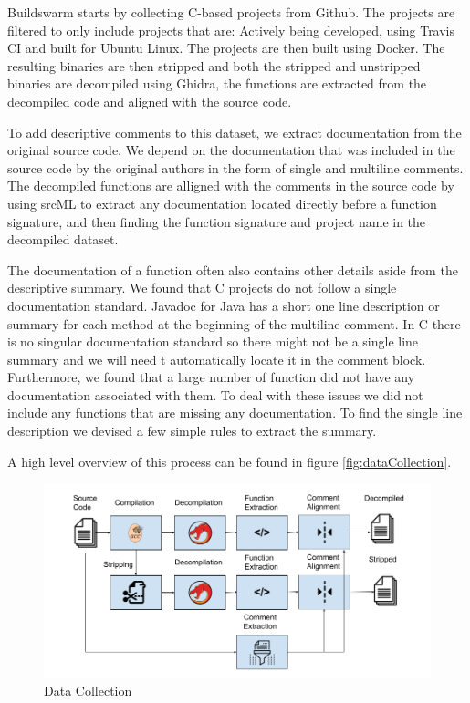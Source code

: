 Buildswarm starts by collecting C-based projects from Github. The projects are filtered to only include projects that are: Actively being developed, using Travis CI and built for Ubuntu Linux. The projects are then built using Docker. The resulting binaries are then stripped and both the stripped and unstripped binaries are decompiled using Ghidra, the functions are extracted from the decompiled code and aligned with the source code. 

To add descriptive comments to this dataset, we extract documentation from the original source code. We depend on the documentation that was included in the source code by the original authors in the form of single and multiline comments. The decompiled functions are alligned with the comments in the source code by using srcML to extract any documentation located directly before a function signature, and then finding the function signature and project name in the decompiled dataset.

The documentation of a function often also contains other details aside from the descriptive summary. We found that C projects do not follow a single documentation standard. Javadoc for Java has a short one line description or summary for each method at the beginning of the multiline comment. In C there is no singular documentation standard so there might not be a single line summary and we will need t automatically locate it in the comment block. 
Furthermore, we found that a large number of function did not have any documentation associated with them. To deal with these issues we did not include any functions that are missing any documentation. To find the single line description we devised a few simple rules to extract the summary.

A high level overview of this process can be found in figure \ref{fig:dataCollection}.

\label{fig:dataCollection}
\begin{figure}[!h]
  \centering
  \includegraphics[width=\linewidth]{img/dataCollection.png}
  \caption{Data Collection}
\end{figure}


